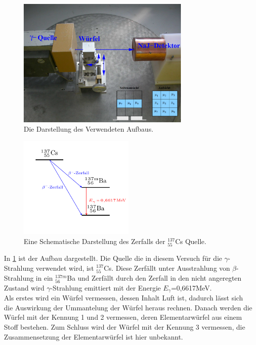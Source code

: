 \begin{figure}[h!]
\centering
\includegraphics[width = 0.75\textwidth]{../Grafiken/Aufbau.pdf}
\caption{Die Darstellung des Verwendeten Aufbaus.}\label{fig:Aufbau}
\end{figure}
\begin{figure}[h!]
	\centering
	\includegraphics[width = 0.5\textwidth]{../Grafiken/Tikz/tikz-Energieschema.pdf}
	\caption{Eine Schematische Darstellung des Zerfalls der ${}^{137}_{55}$Cs Quelle.}
\end{figure}
In \cref{fig:Aufbau} ist der Aufbau dargestellt.
Die Quelle die in diesem Versuch für die $\gamma$-Strahlung verwendet wird, ist ${}^{137}_{55}$Cs.
Diese Zerfällt unter Ausstrahlung von $\beta$-Strahlung in ein ${}^{137m}_{56}$Ba und Zerfällt durch den Zerfall in den nicht angeregten Zustand wird $\gamma$-Strahlung emittiert mit der Energie $E_\gamma$=0,6617MeV.\\
Als erstes wird ein Würfel vermessen, dessen Inhalt Luft ist, dadurch lässt sich die Auswirkung der Ummantelung der Würfel heraus rechnen.
Danach werden die Würfel mit der Kennung 1 und 2 vermessen, deren Elementarwürfel aus einem Stoff bestehen.
Zum Schluss wird der Würfel mit der Kennung 3 vermessen, die Zusammensetzung der Elementarwürfel ist hier unbekannt. 

